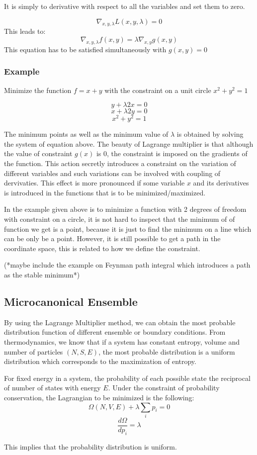 \documentclass[12pt, oneside]{article}   	%
\begin{document}
It is simply to derivative with respect to all the variables and set them to zero. 

$$\nabla_{x,y,\lambda} L(x,y,\lambda) = 0$$
This leads to: 
$$\nabla_{x,y,\lambda} f(x,y) = \lambda \nabla_{x,y} g(x,y)$$
This equation has to be satisfied simultaneously with $g(x,y) = 0$

\subsubsection*{Example}
\par
Minimize the function $f = x + y$ with the constraint on a unit circle $x^2 + y^2 = 1$

$$ y +\lambda  2x = 0$$
$$x + \lambda 2y = 0$$
$$x^2 + y^2 = 1$$
\par
The minimum points as well as the minimum value of $\lambda$ is obtained by solving the system of equation above. The beauty of Lagrange multiplier is that although the value of constraint $g(x)$ is 0, the constraint is imposed on the gradients of the function. This action secretly introduces a constraint on the variation of different variables and such variations can be involved with coupling of dervivaties. This effect is more pronounced if some variable $x$ and its derivatives is introduced in the functions that is to be minimized/maximized. 

\par 
In the example given above is to minimize a function with 2 degrees of freedom with constraint on a circle, it is not hard to inspect that the minimum of of function we get is a point, because it is just to find the minimum on a line which can be only be a point. However, it is still possible to get a path in the coordinate space, this is related to how we define the constraint. 
\par
(*maybe include the example on Feynman path integral which introduces a path as the stable minimum*) 

\subsection{Microcanonical Ensemble}
\par 
By using the Lagrange Multiplier method, we can obtain the most probable distribution function of different ensemble or boundary conditions. From thermodynamics, we know that if a system has constant entropy, volume and number of particles $(N, S, E)$, the most probable distribution is a uniform distribution which corresponds to the maximization of entropy. 
\par 
For fixed energy in a system, the probability of each possible state the reciprocal of number of states with energy $E$. Under the constraint of probability conservation, the Lagrangian to be minimized is the following: 
$$\Omega(N, V, E) + \lambda \sum_i p_i = 0$$ 
$$ \frac{d \Omega }{d p_i } =  \lambda $$
\par 
This implies that the probability distribution is uniform. 
\end{document}
